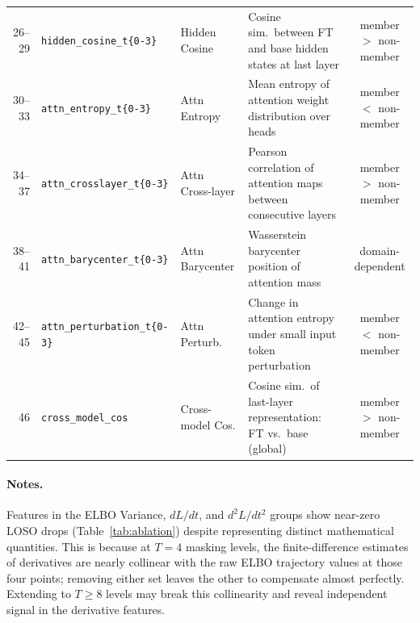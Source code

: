 \begin{table}[h]
\begin{tabular}{r l l p{4.5cm} c}
26--29 & \texttt{hidden\_cosine\_t\{0-3\}}        & Hidden Cosine    & Cosine sim.\ between FT and base hidden states at last layer            & member $>$ non-member \\
30--33 & \texttt{attn\_entropy\_t\{0-3\}}         & Attn Entropy     & Mean entropy of attention weight distribution over heads                 & member $<$ non-member \\
34--37 & \texttt{attn\_crosslayer\_t\{0-3\}}      & Attn Cross-layer & Pearson correlation of attention maps between consecutive layers          & member $>$ non-member \\
38--41 & \texttt{attn\_barycenter\_t\{0-3\}}      & Attn Barycenter  & Wasserstein barycenter position of attention mass                        & domain-dependent \\
42--45 & \texttt{attn\_perturbation\_t\{0-3\}}    & Attn Perturb.    & Change in attention entropy under small input token perturbation         & member $<$ non-member \\
46     & \texttt{cross\_model\_cos}               & Cross-model Cos. & Cosine sim.\ of last-layer representation: FT vs.\ base (global)        & member $>$ non-member \\
\bottomrule
\end{tabular}
\end{table}

\paragraph{Notes.}
Features in the ELBO Variance, $dL/dt$, and $d^2L/dt^2$ groups show near-zero
LOSO drops (Table~\ref{tab:ablation}) despite representing distinct mathematical
quantities.  This is because at $T=4$ masking levels, the finite-difference
estimates of derivatives are nearly collinear with the raw ELBO trajectory values
at those four points; removing either set leaves the other to compensate almost
perfectly.  Extending to $T\geq8$ levels may break this collinearity and reveal
independent signal in the derivative features.
